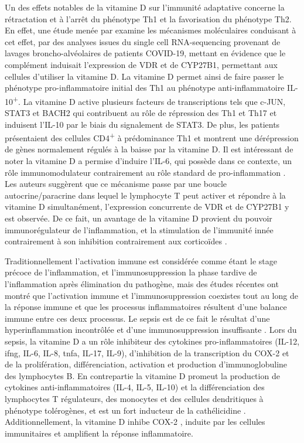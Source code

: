 \documentclass[
  a4paper,
  DIV=11,
  numbers=noendperiod,
  listof=totoc]{scrreprt}
\begin{document}
Un des effets notables de la vitamine D sur l'immunité adaptative
concerne la rétractation et à l'arrêt du phénotype \ac{Th1} et la
favorisation du phénotype Th2. En effet, une étude menée par
\textcite{Chauss.2022} examine les mécanismes moléculaires conduisant à
cet effet, par des analyses issues du single cell RNA-sequencing
provenant de lavages broncho-alvéolaires de patients \ac{COVID-19},
mettant en évidence que le complément induisait l'expression de \ac{VDR}
et de \ac{CYP27B1}, permettant aux cellules d'utiliser la vitamine D. La
vitamine D permet ainsi de faire passer le phénotype pro-inflammatoire
initial des \ac{Th1} au phénotype anti-inflammatoire
IL-10\textsuperscript{+}. La vitamine D active plusieurs facteurs de
transcriptions tels que c-JUN, STAT3 et BACH2 qui contribuent au rôle de
répression des \ac{Th1} et \ac{Th17} et induisent l'IL-10 par le biais
du signalement de STAT3. De plus, les patients présentaient des cellules
CD4\textsuperscript{+} à prédominance \ac{Th1} et montrent une
dérépression de gènes normalement régulés à la baisse par la vitamine D.
Il est intéressant de noter la vitamine D a permise d'induire l'IL-6,
qui possède dans ce contexte, un rôle immunomodulateur contrairement au
rôle standard de pro-inflammation \autocite{Chauss.2022}. Les auteurs
suggèrent que ce mécanisme passe par une boucle autocrine/paracrine dans
lequel le lymphocyte T peut activer et répondre à la vitamine D
simultanément, l'expression concurrente de \ac{VDR} et de \ac{CYP27B1} y
est observée. De ce fait, un avantage de la vitamine D provient du
pouvoir immunorégulateur de l'inflammation, et la stimulation de
l'immunité innée contrairement à son inhibition contrairement aux
corticoïdes \autocite{Bouillon.2021}.

Traditionnellement l'activation immune est considérée comme étant le
stage précoce de l'inflammation, et l'immunosuppression la phase tardive
de l'inflammation après élimination du pathogène, mais des études
récentes ont montré que l'activation immune et l'immunosuppression
coexistes tout au long de la réponse immune et que les processus
inflammatoires résultent d'une balance immune entre ces deux processus.
Le sepsis est de ce fait le résultat d'une hyperinflammation incontrôlée
et d'une immunosuppression insuffisante \autocite{Cutuli.2024}. Lors du
sepsis, la vitamine D a un rôle inhibiteur des cytokines
pro-inflammatoires (IL-12, \ac{ifng}, IL-6, IL-8, \ac{tnfa}, IL-17,
IL-9), d'inhibition de la transcription du COX-2 et de la prolifération,
différenciation, activation et production d'immunoglobuline des
lymphocytes B. En contrepartie la vitamine D promeut la production de
cytokines anti-inflammatoires (IL-4, IL-5, IL-10) et la différenciation
des lymphocytes T régulateurs, des monocytes et des cellules
dendritiques à phénotype tolérogènes, et est un fort inducteur de la
cathélicidine \autocite{Cutuli.2024}. Additionnellement, la vitamine D
inhibe \ac{COX-2} \autocite{Wang.2014}, induite par les cellules
immunitaires et amplifient la réponse inflammatoire.
\end{document}
